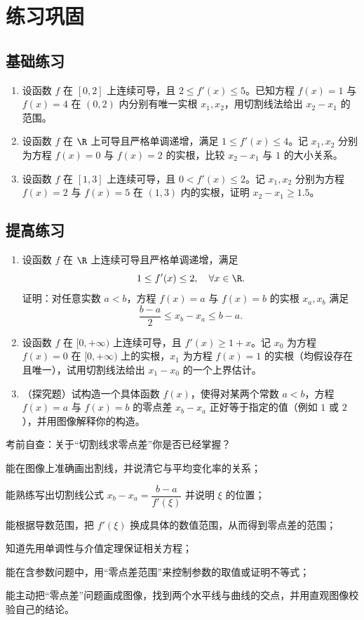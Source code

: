 \documentclass[a4paper,11pt]{ctexart}
\begin{document}
\newpage

\section{练习巩固}

\subsection{基础练习}

\begin{enumerate}
  \item 设函数 $f$ 在 $[0,2]$ 上连续可导，且 $2\leq f'(x)\leq 5$。已知方程 $f(x)=1$ 与 $f(x)=4$ 在 $(0,2)$ 内分别有唯一实根 $x_1,x_2$，用切割线法给出 $x_2-x_1$ 的范围。
  \item 设函数 $f$ 在 $\R$ 上可导且严格单调递增，满足 $1\leq f'(x)\leq 4$。记 $x_1,x_2$ 分别为方程 $f(x)=0$ 与 $f(x)=2$ 的实根，比较 $x_2-x_1$ 与 $1$ 的大小关系。
  \item 设函数 $f$ 在 $[1,3]$ 上连续可导，且 $0< f'(x)\leq 2$。记 $x_1,x_2$ 分别为方程 $f(x)=2$ 与 $f(x)=5$ 在 $(1,3)$ 内的实根，证明 $x_2-x_1\geq 1.5$。
\end{enumerate}

\subsection{提高练习}

\begin{enumerate}
  \item 设函数 $f$ 在 $\R$ 上连续可导且严格单调递增，满足
  \[
  1\leq f'(x)\leq 2,\quad \forall x\in\R.
  \]
  证明：对任意实数 $a<b$，方程 $f(x)=a$ 与 $f(x)=b$ 的实根 $x_a,x_b$ 满足
  \[
  \frac{b-a}{2}\leq x_b-x_a\leq b-a.
  \]
  \item 设函数 $f$ 在 $[0,+\infty)$ 上连续可导，且 $f'(x)\geq 1+x$。记 $x_0$ 为方程 $f(x)=0$ 在 $[0,+\infty)$ 上的实根，$x_1$ 为方程 $f(x)=1$ 的实根（均假设存在且唯一），试用切割线法给出 $x_1-x_0$ 的一个上界估计。
  \item （探究题）试构造一个具体函数 $f(x)$，使得对某两个常数 $a<b$，方程 $f(x)=a$ 与 $f(x)=b$ 的零点差 $x_b-x_a$ 正好等于指定的值（例如 $1$ 或 $2$），并用图像解释你的构造。
\end{enumerate}

\begin{NoteChecklist}{考前自查：关于“切割线求零点差”你是否已经掌握？}
  \item 能在图像上准确画出割线，并说清它与平均变化率的关系；
  \item 能熟练写出切割线公式 $x_b-x_a=\dfrac{b-a}{f'(\xi)}$ 并说明 $\xi$ 的位置；
  \item 能根据导数范围，把 $f'(\xi)$ 换成具体的数值范围，从而得到零点差的范围；
  \item 知道先用单调性与介值定理保证相关方程；
  \item 能在含参数问题中，用“零点差范围”来控制参数的取值或证明不等式；
  \item 能主动把“零点差”问题画成图像，找到两个水平线与曲线的交点，并用直观图像校验自己的结论。
\end{NoteChecklist}
\end{document}
